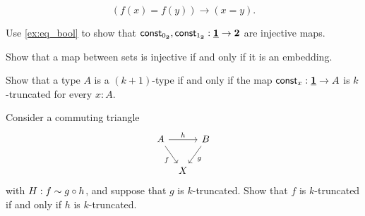 \begin{exercises}
\begin{equation*}
(f(x)= f(y))\to (x=y).
\end{equation*}
\begin{subexenum}
\item Use \cref{ex:eq_bool} to show that $\mathsf{const}_{0_{\mathbf{2}}},\mathsf{const}_{1_{\mathbf{2}}}:\underline{\mathbf{1}}\to \mathbf{2}$ are injective maps.
\item Show that a map between sets is injective if and only if it is an embedding.
\end{subexenum}
\item Show that a type $A$ is a $(k+1)$-type if and only if the map $\mathsf{const}_x:\underline{\mathbf{1}}\to A$ is $k$-truncated for every $x:A$.
\item Consider a commuting triangle
\begin{equation*}
\begin{tikzcd}[column sep=tiny]
A \arrow[rr,"h"] \arrow[dr,swap,"f"] & & B \arrow[dl,"g"] \\
& X
\end{tikzcd}
\end{equation*}
with $H: f \sim g \circ h$, and suppose that $g$ is $k$-truncated. Show that $f$ is $k$-truncated if and only if $h$ is $k$-truncated.
\end{exercises}
